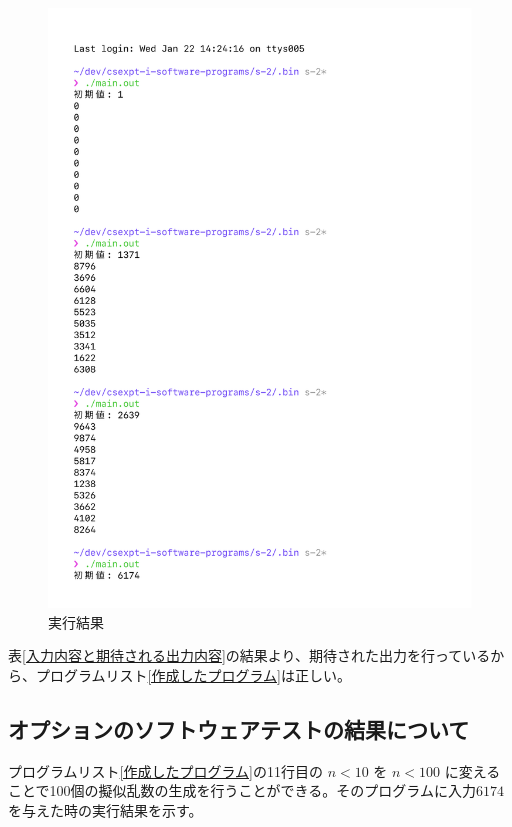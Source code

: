 \begin{figure}[H]
    \ContinuedFloat
    \centering
    \includegraphics[width=0.8\hsize, pagebox=mediabox, page=3]{main_result_img.pdf}
    \caption{実行結果}
    \label{実行結果}
\end{figure}

表\ref{入力内容と期待される出力内容}の結果より、期待された出力を行っているから、プログラムリスト\ref{作成したプログラム}は正しい。

\subsection{オプションのソフトウェアテストの結果について}

プログラムリスト\ref{作成したプログラム}の11行目の $n < 10$ を $n < 100$ に変えることで100個の擬似乱数の生成を行うことができる。そのプログラムに入力$6174$を与えた時の実行結果を示す。

